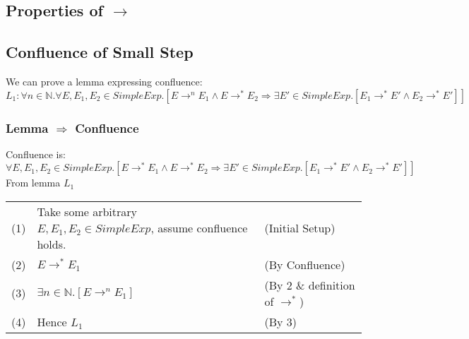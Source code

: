 \documentclass{report}
\begin{document}
        \subsection*{Properties of $\to$}
            \begin{itemize}
            \end{itemize}

        \subsection*{Confluence of Small Step}
            We can prove a lemma expressing confluence:
            \[L_1 : \forall n \in \mathbb{N} . \forall E, E_1, E_2 \in SimpleExp . [E \to^n E_1 \land E \to^* E_2 \Rightarrow \exists E' \in SimpleExp . [E_1 \to^* E' \land E_2 \to^* E']]\]
            \subsubsection*{Lemma $\Rightarrow$ Confluence}
                Confluence is: $\forall E, E_1, E_2 \in SimpleExp . [E \to^* E_1 \land E \to^* E_2 \Rightarrow \exists E' \in SimpleExp . [E_1 \to^* E' \land E_2 \to^* E']]$
                From lemma $L_1$
                \begin{center}
                    \begin{tabular}{l l l}
                        (1) & Take some arbitrary $E, E_1, E_2 \in SimpleExp$, assume confluence holds. & (Initial Setup) \\
                        (2) & $E \to^* E_1$ & (By Confluence) \\
                        (3) & $\exists n \in \mathbb{N} .[E \to^n E_1]$ & (By 2 \& definition of $\to^*$) \\
                        (4) & Hence $L_1$ & (By 3) \\
                    \end{tabular}
                \end{center}
\end{document}
